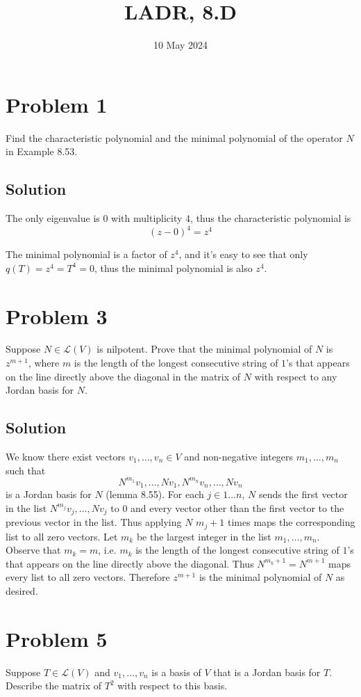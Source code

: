 \documentclass{article}
\title{LADR, 8.D}
\date{10 May 2024}
\begin{document}
\maketitle

\section*{Problem 1}
Find the characteristic polynomial and the minimal polynomial of the operator $N$ in Example 8.53.

\subsection*{Solution}
The only eigenvalue is $0$ with multiplicity $4$, thus the characteristic polynomial is
\[(z-0)^4=z^4\]

The minimal polynomial is a factor of $z^4$, and it's easy to see that only $q(T)=z^4=T^4=0$, thus the minimal polynomial is also $z^4$.

\section*{Problem 3}
Suppose $N\in\mathcal{L}(V)$ is nilpotent. Prove that the minimal polynomial of $N$ is $z^{m+1}$, where $m$ is the length of the longest consecutive string of $1$'s that appears on the line directly above the diagonal in the matrix of $N$ with respect to any Jordan basis for $N$.

\subsection*{Solution}
We know there exist vectors $v_1,\ldots,v_n\in V$ and non-negative integers $m_1,\ldots,m_n$ such that
\[N^{m_1}v_1,\ldots,N v_1,N^{m_n}v_n,\ldots,N v_n\]
is a Jordan basis for $N$ (lemma 8.55). For each $j\in1\ldots n$, $N$ sends the first vector in the list $N^{m_j}v_j,\ldots,N v_j$ to $0$ and every vector other than the first vector to the previous vector in the list. Thus applying $N$ $m_j+1$ times maps the corresponding list to all zero vectors. Let $m_k$ be the largest integer in the list $m_1,\ldots,m_n$. Observe that $m_k=m$, i.e. $m_k$ is the length of the longest consecutive string of $1$'s that appears on the line directly above the diagonal. Thus $N^{m_k+1}=N^{m+1}$ maps every list to all zero vectors. Therefore $z^{m+1}$ is the minimal polynomial of $N$ as desired.

\section*{Problem 5}
Suppose $T\in\mathcal{L}(V)$ and $v_1,\ldots,v_n$ is a basis of $V$ that is a Jordan basis for $T$. Describe the matrix of $T^2$ with respect to this basis.
\end{document}
